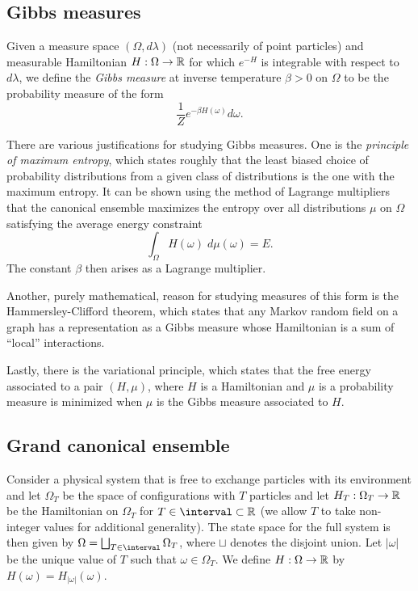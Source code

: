 \subsection{Gibbs measures}

Given a measure space $(\Omega, d\lambda)$ (not necessarily of point particles) and measurable
Hamiltonian $H : \Omega \rightarrow {\mathbb R}$ for which $e^{-H}$ is integrable with respect to $d\lambda$,
we define the \emph{Gibbs measure} at inverse temperature $\beta > 0$
on $\Omega$ to be the probability measure of the form
\begin{equation}
\frac{1}{Z} e^{-\beta H(\omega)} d\omega.
\end{equation}

There are various justifications for studying Gibbs measures.
One is the \emph{principle of maximum entropy}, which states roughly that the least
biased choice of probability distributions from a given class of distributions is the
one with the maximum entropy. It can be shown using the method of Lagrange multipliers
that the canonical ensemble maximizes the
entropy over all distributions $\mu$ on $\Omega$ satisfying the average energy constraint
\begin{equation}
\int_{\Omega} H(\omega) \; d\mu(\omega) = E.
\end{equation}
The constant $\beta$ then arises as a Lagrange multiplier.

Another, purely mathematical, reason for studying measures of this form is the Hammersley-Clifford
theorem, which states that any Markov random field on a graph has a representation as a Gibbs
measure whose Hamiltonian is a sum of ``local'' interactions.

Lastly, there is the variational principle, which states that the free energy associated to
a pair $(H, \mu)$, where $H$ is a Hamiltonian and $\mu$ is a probability measure is minimized
when $\mu$ is the Gibbs measure associated to $H$.


\subsection{Grand canonical ensemble}

Consider a physical system that is free to exchange particles with its environment
and let $\Omega_T$ be the space of configurations with $T$
particles and let $H_T : \Omega_T \rightarrow {\mathbb R}$ be the Hamiltonian on $\Omega_T$
for $T\in\interval\subset\R$ (we allow $T$ to take non-integer values for
additional generality).
The state space for the full system is then given by $\Omega = \bigsqcup_{T \in \interval} \Omega_T$,
where $\sqcup$ denotes the disjoint union. Let $|\omega|$ be the unique value of $T$
such that $\omega \in \Omega_T$.
We define $H : \Omega \rightarrow {\mathbb R}$ by $H(\omega) = H_{|\omega|}(\omega)$.

